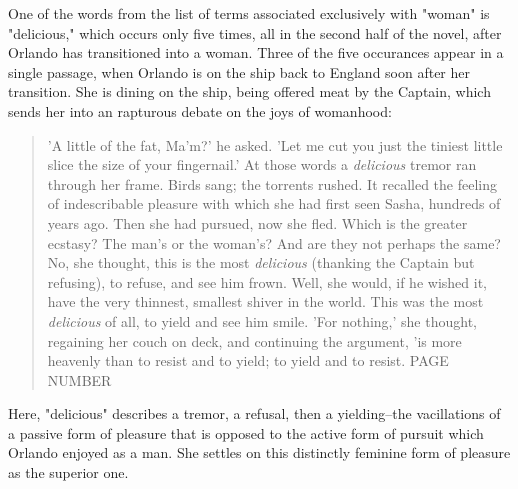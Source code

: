 \documentclass[11pt]{article}
\begin{document}
One of the words from the list of terms associated exclusively with
"woman" is "delicious," which occurs only five times, all in the
second half of the novel, after Orlando has transitioned into a
woman. Three of the five occurances appear in a single passage, when
Orlando is on the ship back to England soon after her transition. She
is dining on the ship, being offered meat by the Captain, which sends
her into an rapturous debate on the joys of womanhood:
\begin{quote}
'A little of the fat, Ma'm?' he asked. 'Let me cut you just the
tiniest little slice the size of your fingernail.' At those words a
\emph{delicious} tremor ran through her frame. Birds sang; the torrents
rushed. It recalled the feeling of indescribable pleasure with which
she had first seen Sasha, hundreds of years ago. Then she had pursued,
now she fled.  Which is the greater ecstasy? The man's or the woman's?
And are they not perhaps the same? No, she thought, this is the most
\emph{delicious} (thanking the Captain but refusing), to refuse, and see
him frown. Well, she would, if he wished it, have the very thinnest,
smallest shiver in the world. This was the most \emph{delicious} of all, to
yield and see him smile. 'For nothing,' she thought, regaining her
couch on deck, and continuing the argument, 'is more heavenly than to
resist and to yield; to yield and to resist. PAGE NUMBER
\end{quote}
Here, "delicious" describes a tremor, a refusal, then a yielding--the
vacillations of a passive form of pleasure that is opposed to the
active form of pursuit which Orlando enjoyed as a man. She settles on
this distinctly feminine form of pleasure as the superior one.
\end{document}
